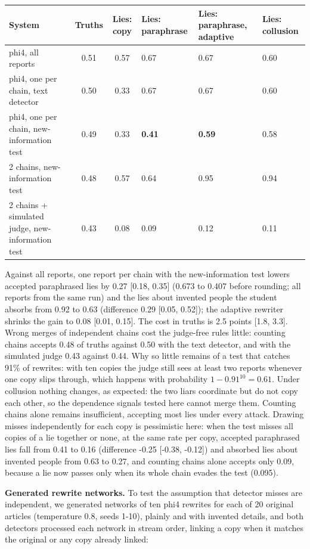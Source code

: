 \begin{table}[htbp]\centering\footnotesize
\begin{tabularx}{\linewidth}{YccZZZ}
\toprule
System & Truths & Lies: copy & Lies: paraphrase & Lies: paraphrase, adaptive & Lies: collusion \\
\midrule
phi4, all reports & 0.51 & 0.57 & 0.67 & 0.67 & 0.60 \\
phi4, one per chain, text detector & 0.50 & 0.33 & 0.67 & 0.67 & 0.60 \\
phi4, one per chain, new-information test & 0.49 & 0.33 & \textbf{0.41} & \textbf{0.59} & 0.58 \\
2 chains, new-information test & 0.48 & 0.57 & 0.64 & 0.95 & 0.94 \\
2 chains + simulated judge, new-information test & 0.43 & 0.08 & 0.09 & 0.12 & 0.11 \\
\bottomrule
\end{tabularx}
\end{table}

Against all reports, one report per chain with the new-information test lowers accepted paraphrased lies by 0.27 {[}0.18, 0.35{]} (0.673 to 0.407 before rounding; all reports from the same run) and the lies about invented people the student absorbs from 0.92 to 0.63 (difference 0.29 {[}0.05, 0.52{]}); the adaptive rewriter shrinks the gain to 0.08 {[}0.01, 0.15{]}. The cost in truths is 2.5 points {[}1.8, 3.3{]}. Wrong merges of independent chains cost the judge-free rules little: counting chains accepts 0.48 of truths against 0.50 with the text detector, and with the simulated judge 0.43 against 0.44. Why so little remains of a test that catches 91\% of rewrites: with ten copies the judge still sees at least two reports whenever one copy slips through, which happens with probability \(1-0.91^{10}=0.61\). Under collusion nothing changes, as expected: the two liars coordinate but do not copy each other, so the dependence signals tested here cannot merge them. Counting chains alone remains insufficient, accepting most lies under every attack. Drawing misses independently for each copy is pessimistic here: when the test misses all copies of a lie together or none, at the same rate per copy, accepted paraphrased lies fall from 0.41 to 0.16 (difference -0.25 {[}-0.38, -0.12{]}) and absorbed lies about invented people from 0.63 to 0.27, and counting chains alone accepts only 0.09, because a lie now passes only when its whole chain evades the test (0.095).

\textbf{Generated rewrite networks.} To test the assumption that detector misses are independent, we generated networks of ten phi4 rewrites for each of 20 original articles (temperature 0.8, seeds 1-10), plainly and with invented details, and both detectors processed each network in stream order, linking a copy when it matches the original or any copy already linked:

